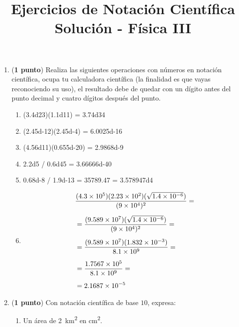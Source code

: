 \documentclass[14pt]{extarticle}
\title{\vspace*{-2cm} Ejercicios de Notación Científica \\  Solución - Física III\vspace{-5ex}}
\date{}
\begin{document}
\maketitle

\begin{enumerate}
\item (\textbf{1 punto}) Realiza las siguientes operaciones con números en notación científica, ocupa tu calculadora científica (la finalidad es que vayas reconociendo su uso), el resultado debe de quedar con un dígito antes del punto decimal y cuatro dígitos después del punto.
\begin{enumerate}
    \item (\num{3.4d23})(\num{1.1d11}) = \num{3.74d34}
    \item (\num{2.45d-12})(\num{2.45d-4}) = \num{6.0025d-16}
    \item (\num{4.56d11})(\num{0.655d-20}) = \num{2.9868d-9}
    \item \num{2.2d5} / \num{0.6d45} = \num{3.66666d-40}
    \item \num{0.68d-8} / \num{1.9d-13} = \num{35789.47} = \num{3.578947d4}
    \item
    \begin{eqnarray*}
    \begin{aligned}
    &\dfrac{(\num{4.3d5})(\num{2.23d2})(\sqrt{\num{1.4d-6}})}{(\num{9d4})^{2}} = \\[0.5em]
    &= \dfrac{(\num{9.589d7})(\sqrt{\num{1.4d-6}})}{(\num{9d4})^{2}} = \\[0.5em]
    &= \dfrac{(\num{9.589d7})(\num{1.832d-3})}{\num{8.1d9}} = \\[0.5em]
    &= \dfrac{\num{1.7567d5}}{\num{8.1d9}} = \\[0.5em]
    &= \num{2.1687d-5}
    \end{aligned}
    \end{eqnarray*}
\end{enumerate}
\item (\textbf{1 punto}) Con notación científica de base $10$, expresa:
\begin{enumerate}
\item Un área de \SI{2}{\square\kilo\meter} en \unit{\square\centi\meter}.


\end{enumerate}
\end{enumerate}
\end{document}
